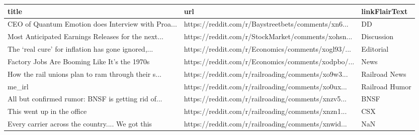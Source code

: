 \documentclass{article}%
\begin{document}
%


\begin{table}[htbp]%
\centering%
\begin{adjustbox}{width=1\textwidth}%
\begin{tabular}{lll}
\toprule
                                             title &                                                url &  linkFlairText \\
\midrule
CEO of Quantum Emotion does Interview with Proa... & https://reddit.com/r/Baystreetbets/comments/xn6... &             DD \\
Most Anticipated Earnings Releases for the next... & https://reddit.com/r/StockMarket/comments/xohsn... &     Discussion \\
The ‘real cure’ for inflation has gone ignored,... & https://reddit.com/r/Economics/comments/xogl93/... &      Editorial \\
      Factory Jobs Are Booming Like It’s the 1970s & https://reddit.com/r/Economics/comments/xodpbo/... &           News \\
How the rail unions plan to ram through their s... & https://reddit.com/r/railroading/comments/xo9w3... &  Railroad News \\
                                            me\_irl & https://reddit.com/r/railroading/comments/xo0ux... & Railroad Humor \\
All but confirmed rumor: BNSF is getting rid of... & https://reddit.com/r/railroading/comments/xnzv5... &           BNSF \\
                        This went up in the office & https://reddit.com/r/railroading/comments/xnzn1... &            CSX \\
  Every carrier across the country.... We got this & https://reddit.com/r/railroading/comments/xnwid... &            NaN \\
\bottomrule
\end{tabular}
%
\end{adjustbox}%
\end{table}

%
\end{document}
